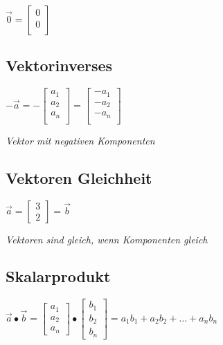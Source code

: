 $\vec{0} = \begin{bmatrix}
    0 \\
    0 \\
\end{bmatrix}$

\subsection{Vektorinverses}

$-\vec{a} = - \begin{bmatrix}
    a_1 \\
    a_2 \\
    a_n \\
\end{bmatrix} = \begin{bmatrix}
    -a_1 \\
    -a_2 \\
    -a_n \\
\end{bmatrix}$

\textit{Vektor mit negativen Komponenten}

\subsection{Vektoren Gleichheit}

$\vec{a} = \begin{bmatrix}
    3 \\
    2
\end{bmatrix} = \vec{b}$

\textit{Vektoren sind gleich, wenn Komponenten gleich}

\subsection{Skalarprodukt}

$\vec{a} \bullet \vec{b} = \begin{bmatrix}
    a_1 \\
    a_2 \\
    a_n
\end{bmatrix} \bullet \begin{bmatrix}
    b_1 \\
    b_2 \\
    b_n
\end{bmatrix} = a_1 b_1 + a_2 b_2 + \dots + a_n b_n$

